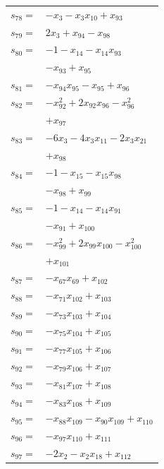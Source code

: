 \begin{longtable}{@{}r@{\;}l@{}}
\(s_{78}=\) & \(\displaystyle -x_{3} -x_{3}x_{10} +x_{93}\) \\[3pt]
\(s_{79}=\) & \(\displaystyle 2x_{3} +x_{94} -x_{98}\) \\[3pt]
\(s_{80}=\) & \(\displaystyle -1 -x_{14} -x_{14}x_{93}\) \\
 & \(\displaystyle -x_{93} +x_{95}\) \\[3pt]
\(s_{81}=\) & \(\displaystyle -x_{94}x_{95} -x_{95} +x_{96}\) \\[3pt]
\(s_{82}=\) & \(\displaystyle -x_{92}^{2} +2x_{92}x_{96} -x_{96}^{2}\) \\
 & \(\displaystyle +x_{97}\) \\[3pt]
\(s_{83}=\) & \(\displaystyle -6x_{3} -4x_{3}x_{11} -2x_{3}x_{21}\) \\
 & \(\displaystyle +x_{98}\) \\[3pt]
\(s_{84}=\) & \(\displaystyle -1 -x_{15} -x_{15}x_{98}\) \\
 & \(\displaystyle -x_{98} +x_{99}\) \\[3pt]
\(s_{85}=\) & \(\displaystyle -1 -x_{14} -x_{14}x_{91}\) \\
 & \(\displaystyle -x_{91} +x_{100}\) \\[3pt]
\(s_{86}=\) & \(\displaystyle -x_{99}^{2} +2x_{99}x_{100} -x_{100}^{2}\) \\
 & \(\displaystyle +x_{101}\) \\[3pt]
\(s_{87}=\) & \(\displaystyle -x_{67}x_{69} +x_{102}\) \\[3pt]
\(s_{88}=\) & \(\displaystyle -x_{71}x_{102} +x_{103}\) \\[3pt]
\(s_{89}=\) & \(\displaystyle -x_{73}x_{103} +x_{104}\) \\[3pt]
\(s_{90}=\) & \(\displaystyle -x_{75}x_{104} +x_{105}\) \\[3pt]
\(s_{91}=\) & \(\displaystyle -x_{77}x_{105} +x_{106}\) \\[3pt]
\(s_{92}=\) & \(\displaystyle -x_{79}x_{106} +x_{107}\) \\[3pt]
\(s_{93}=\) & \(\displaystyle -x_{81}x_{107} +x_{108}\) \\[3pt]
\(s_{94}=\) & \(\displaystyle -x_{83}x_{108} +x_{109}\) \\[3pt]
\(s_{95}=\) & \(\displaystyle -x_{88}x_{109} -x_{90}x_{109} +x_{110}\) \\[3pt]
\(s_{96}=\) & \(\displaystyle -x_{97}x_{110} +x_{111}\) \\[3pt]
\(s_{97}=\) & \(\displaystyle -2x_{2} -x_{2}x_{18} +x_{112}\) \\[3pt]

\end{longtable}
